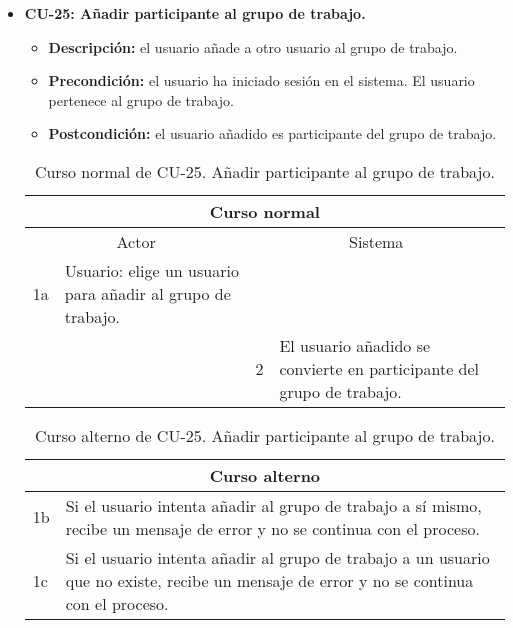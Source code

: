 \begin{itemize}
	\item \textbf{CU-25: Añadir participante al grupo de trabajo.}
	\begin{itemize}
		\item \textbf{Descripción:} el usuario añade a otro usuario al grupo de trabajo.
		\item \textbf{Precondición:} el usuario ha iniciado sesión en el sistema. El usuario pertenece al grupo de trabajo.
		\item \textbf{Postcondición:} el usuario añadido es participante del grupo de trabajo.
	\end{itemize}
	\begin{table}[H]
		\centering
		\begin{tabular}{|p{0.3cm}|p{5cm}|p{0.3cm}|p{5cm}|}
			\hline
			\multicolumn{4}{|c|}{Curso normal} \\ \hline
			\multicolumn{2}{|c|}{Actor} & \multicolumn{2}{|c|}{Sistema} \\ \hline
			1a & Usuario: elige un usuario para añadir al grupo de trabajo. &  &  \\ \hline
			&  & 2 & El usuario añadido se convierte en participante del grupo de trabajo. \\ \hline
		\end{tabular}
		\caption{Curso normal de CU-25. Añadir participante al grupo de trabajo.}
		\label{tabla:cu25-normal}
	\end{table}
	
	\begin{table}[H]
		\centering
		\begin{tabular}{|p{0.3cm}|p{10cm}|}
			\hline
			\multicolumn{2}{|c|}{Curso alterno} \\ \hline
			1b & Si el usuario intenta añadir al grupo de trabajo a sí mismo, recibe un mensaje de error y no se continua con el proceso. \\ \hline
			1c & Si el usuario intenta añadir al grupo de trabajo a un usuario que no existe, recibe un mensaje de error y no se continua con el proceso. \\ \hline
		\end{tabular}
		\caption{Curso alterno de CU-25. Añadir participante al grupo de trabajo.}
		\label{tabla:cu25-alterno}
	\end{table}
\end{itemize}

